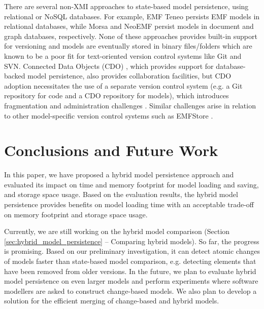 \vspace{-10pt}
There are several non-XMI approaches to state-based model persistence, using relational or NoSQL databases. For example, EMF Teneo \cite{eclipse2017teneo} persists EMF models in relational databases, while Morsa \cite{DBLP:conf/models/Espinazo-PaganCM11} and NeoEMF \cite{daniel2016neoemf} persist models in document and graph databases, respectively. None of these approaches provides built-in support for versioning and models are eventually stored in binary files/folders which are known to be a poor fit for text-oriented version control systems like Git and SVN. Connected Data Objects (CDO) \cite{eclipse2017cdo}, which provides support for database-backed model persistence, also provides collaboration facilities, but CDO adoption necessitates the use of a separate version control system (e.g. a Git repository for code and a CDO repository for models), which introduces fragmentation and administration challenges \cite{barmpis2014evaluation}. Similar challenges arise in relation to other model-specific version control systems such as EMFStore \cite{koegel2010emfstore}. %

\vspace{-10pt}
\section{Conclusions and Future Work}
\label{sec:conlcusions_and_future_work}

\vspace{-10pt}
In this paper, we have proposed a hybrid model persistence approach and evaluated its impact on time and memory footprint for model loading and saving, and storage space usage.
Based on the evaluation results, the hybrid model persistence provides benefits on model loading time 
with an acceptable trade-off on memory footprint and storage space usage. 

Currently, we are still working on the hybrid model comparison (Section \ref{sec:hybrid_model_persistence} -- Comparing hybrid models). So far, the progress is promising. Based on our preliminary investigation, it can detect atomic changes of models faster than state-based model comparison, e.g. detecting elements that have been removed from older versions. In the future, we plan to evaluate hybrid model persistence on even larger models and perform experiments where software modellers are asked to construct change-based models. We also plan to develop a solution for the efficient merging of change-based and hybrid models. 
